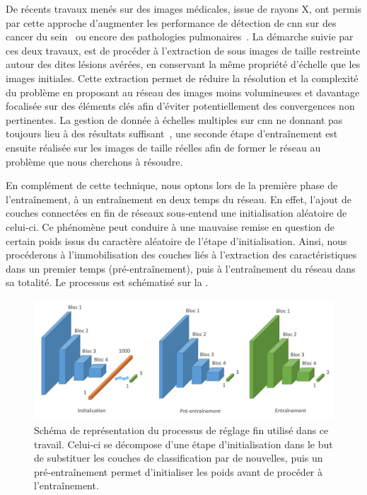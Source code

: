 De récents travaux menés sur des images médicales, issue de rayons X, ont permis par cette approche d'augmenter les performance de détection de \gls{cnn} sur des cancer du sein~\cite{Lotter2017} ou encore des pathologies pulmonaires~\cite{Park2019}. La démarche suivie par ces deux travaux, est de procéder à l'extraction de sous images de taille restreinte autour des dites lésions avérées, en conservant la même propriété d'échelle que les images initiales. Cette extraction permet de réduire la résolution et la complexité du problème en proposant au réseau des images moins volumineuses et davantage focalisée sur des éléments clés afin d'éviter potentiellement des convergences non pertinentes. La gestion de donnée à échelles multiples sur \gls{cnn} ne donnant pas toujours lieu à des résultats suffisant~\cite{Noord2017}, une seconde étape d'entraînement est ensuite réalisée sur les images de taille réelles afin de former le réseau au problème que nous cherchons à résoudre.\par

En complément de cette technique, nous optons lors de la première phase de l'entraînement, à un entraînement en deux temps du réseau. En effet, l'ajout de couches connectées en fin de réseaux sous-entend une initialisation aléatoire de celui-ci. Ce phénomène peut conduire à une mauvaise remise en question de certain poids issus du caractère aléatoire de l'étape d'initialisation. Ainsi, nous procéderons à l'immobilisation des couches liés à l'extraction des caractéristiques dans un premier temps (pré-entraînement), puis à l'entraînement du réseau dans sa totalité. Le processus est schématisé sur la .\par

\begin{figure}[H]
    \centering
    \includegraphics[width=\linewidth]{contents/chapter_5/resources/scheme_image_fine_tune.pdf}
    \caption{Schéma de représentation du processus de réglage fin utilisé dans ce travail. Celui-ci se décompose d'une étape d'initialisation dans le but de substituer les couches de classification par de nouvelles, puis un pré-entraînement permet d'initialiser les poids avant de procéder à l'entraînement.}
    \label{fig:scheme_image_fine_tune}
\end{figure}\par

